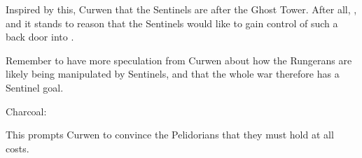 Inspired by this, Curwen  that the Sentinels are after the Ghost Tower. 
After all, , and it stands to reason that the Sentinels would like to gain control of such a back door into \Nyx. 

Remember to have more speculation from Curwen about how the Rungerans are likely being manipulated by Sentinels, and that the whole war therefore has a Sentinel goal. 

\begin{prose}
  Charcoal:
\end{prose}

This prompts Curwen to convince the Pelidorians that they must hold \Forklin{} at all costs. 









